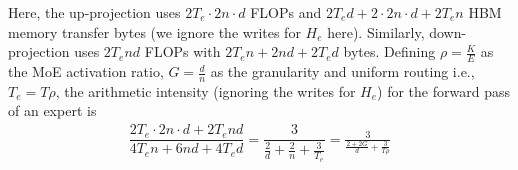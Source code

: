 Here, the up-projection uses $2 T_e \cdot 2n \cdot d$ FLOPs and $2 T_e d + 2 \cdot 2n \cdot d + 2 T_e n$ HBM memory transfer bytes (we ignore the writes for $H_e$ here). Similarly, down-projection uses $2 T_e n d$ FLOPs with $2 T_e n + 2 n d + 2 T_e d$  bytes. Defining $\rho = \frac{K}{E}$ as the MoE activation ratio, $G = \frac{d}{n}$ as the granularity and uniform routing i.e., $T_e = T\rho$, the arithmetic intensity (ignoring the writes for $H_e$) for the forward pass of an expert is
\vspace{-.5em}
\begin{align}    \label{eqn:arithmetic_intensity}
    \dfrac{2 T_e \cdot 2n \cdot d +  2 T_e n d}{4 T_e n + 6 n d + 4 T_e d} = \dfrac{3}{\frac{2}{d} + \frac{2}{n} + \frac{3}{T_e}} = \frac{3}{\frac{2 + 2G}{d} + \frac{3}{T\rho}}
\end{align}
\vspace{-1.5em}



